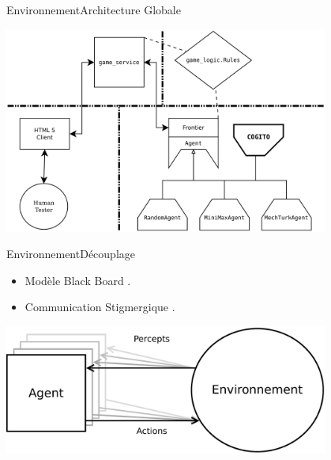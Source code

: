 \begin{frame}{Environnement}{Architecture Globale}
\begin{center}
\includegraphics[width=0.8\textwidth]{img/william/archi_full}\\
\end{center}
\end{frame}
\begin{frame}{Environnement}{Découplage}
\begin{itemize}
\item Modèle \og Black Board \fg{}.
\item Communication \og Stigmergique \fg{}.
\end{itemize}
\begin{center}
\includegraphics[width=0.8\textwidth]{img/william/agent_env}\\
\end{center}
\end{frame}
